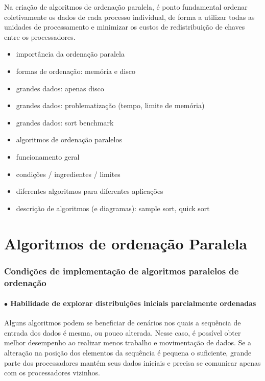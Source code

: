 Na criação de algoritmos de ordenação paralela, é ponto fundamental ordenar coletivamente os dados de cada processo individual, de forma a utilizar todas as unidades de processamento e minimizar os custos de redistribuição de chaves entre os processadores.
\label{cap:ordenacao}

\begin{itemize}
\item importância da ordenação paralela
\item formas de ordenação: memória e disco
\item grandes dados: apenas disco
\item grandes dados: problematização (tempo, limite de memória)
\item grandes dados: sort benchmark
\end{itemize}


\begin{itemize}
\item algoritmos de ordenação paralelos
\item funcionamento geral 
\item condições / ingredientes / limites
\item diferentes algoritmos para diferentes aplicações
\item descrição de algoritmos (e diagramas): sample sort, quick sort

\end{itemize}
\section{Algoritmos de ordenação Paralela}

\subsubsection*{Condições de implementação de algoritmos paralelos de ordenação}

\paragraph*{ $\bullet$ Habilidade de explorar distribuições iniciais parcialmente ordenadas}
Alguns algoritmos podem se beneficiar de cenários nos quais a sequência de entrada dos dados é mesma, ou pouco alterada. Nesse caso, é possível obter melhor desempenho ao realizar menos trabalho e movimentação de dados. 
Se a alteração na posição dos elementos da sequência é pequena o suficiente, grande parte dos processadores mantém seus dados iniciais e precisa se comunicar apenas com os processadores vizinhos.


